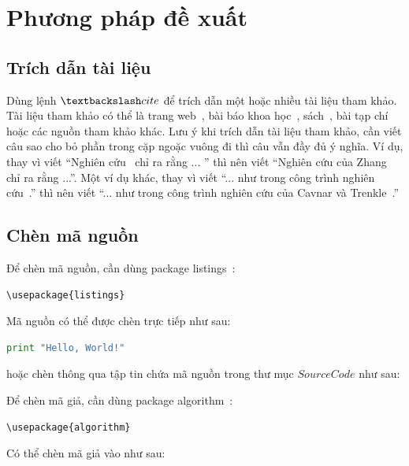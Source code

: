 \chapter{Phương pháp đề xuất}
\label{Chapter3}

\section{Trích dẫn tài liệu}

Dùng lệnh $\textbackslash cite$ để trích dẫn một hoặc nhiều tài liệu tham khảo.
Tài liệu tham khảo có thể là trang web~\cite{Listings,HDLVThS}, bài báo khoa học~\cite{1994-Cavnar}, sách~\cite{1984-TeX-Knuth,2006-DDien,2006-NPTV}, bài tạp chí~\cite{1989-TED} hoặc các nguồn tham khảo khác. 
Lưu ý khi trích dẫn tài liệu tham khảo, cần viết câu sao cho bỏ phần trong cặp ngoặc vuông đi thì câu vẫn đầy đủ ý nghĩa.
Ví dụ, thay vì viết ``Nghiên cứu~\cite{1989-TED} chỉ ra rằng ... '' thì nên viết ``Nghiên cứu của Zhang~\cite{1989-TED} chỉ ra rằng ...''.
Một ví dụ khác, thay vì viết ``... như trong công trình nghiên cứu~\cite{1994-Cavnar}.'' thì nên viết ``... như trong công trình nghiên cứu của Cavnar và Trenkle~\cite{1994-Cavnar}.''

\section{Chèn mã nguồn}

Để chèn mã nguồn, cần dùng package listings~\cite{Listings}:

\begin{lstlisting}
\usepackage{listings}
\end{lstlisting}

Mã nguồn có thể được chèn trực tiếp như sau:

\begin{lstlisting}[language=Python]
print "Hello, World!"
\end{lstlisting}

hoặc chèn thông qua tập tin chứa mã nguồn trong thư mục $SourceCode$ như sau:



Để chèn mã giả, cần dùng package algorithm~\cite{Algorithm}:

\begin{lstlisting}
\usepackage{algorithm}
\end{lstlisting}

Có thể chèn mã giả vào như sau:

